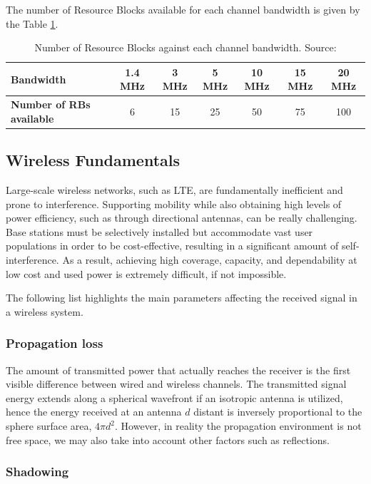 The number of Resource Blocks available for each channel bandwidth is given by the Table \ref{table:rb}. 

\begin{table}[h]
  \centering
  \begin{tabular}{@{}lcccccc@{}}
  \toprule
  \textbf{Bandwidth}               & 1.4 MHz & 3 MHz & 5 MHz & 10 MHz & 15 MHz & 20 MHz \\ \midrule
  \textbf{Number of RBs available} & 6       & 15    & 25    & 50     & 75     & 100    \\ \bottomrule
  \end{tabular}
  \caption{Number of Resource Blocks against each channel bandwidth. Source: \cite{ofdma1}}
  \label{table:rb}
\end{table}


\subsection{Wireless Fundamentals}

Large-scale wireless networks, such as LTE, are fundamentally inefficient and prone to 
interference. Supporting mobility while also obtaining high levels of power efficiency, 
such as through directional antennas, can be really challenging. Base stations must be 
selectively installed but accommodate vast user populations in order to be cost-effective, 
resulting in a significant amount of self-interference. As a result, achieving high coverage, 
capacity, and dependability at low cost and used power is extremely difficult, if not impossible.

The following list highlights the main parameters affecting the received signal in a wireless system. 


\subsubsection{Propagation loss} 

The amount of transmitted power that actually reaches the receiver is the first visible 
difference between wired and wireless channels. The transmitted signal energy extends along 
a spherical wavefront if an isotropic antenna is utilized, hence the energy received at an 
antenna ${d}$ distant is inversely proportional to the sphere surface area, ${4\pi d^2}$.
However, in reality the propagation environment is not free space, we may also take into
account other factors such as reflections.

\subsubsection{Shadowing} 

